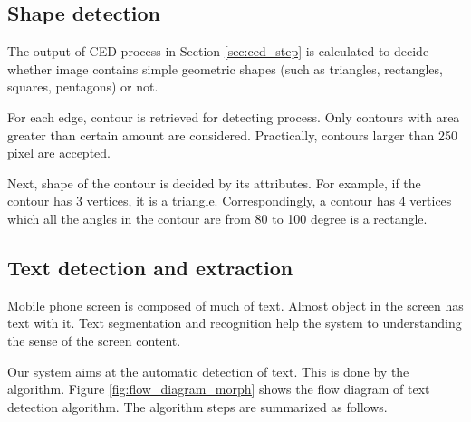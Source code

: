 \subsection{Shape detection}
\label{sec:shape_detect}
The output of CED process in Section \ref{sec:ced_step} is calculated to decide whether image contains simple geometric shapes (such as triangles, rectangles, squares, pentagons) or not.

For each edge, contour is retrieved for detecting process. Only contours with area greater than certain amount are considered. Practically, contours larger than 250 pixel are accepted.

Next, shape of the contour is decided by its attributes. For example, if the contour has 3 vertices, it is a triangle. Correspondingly, a contour has 4 vertices which all the angles in the contour are from 80 to 100 degree is a rectangle.

\subsection{Text detection and extraction}
\label{sec:text_detect}
Mobile phone screen is composed of much of text. Almost object in the screen has text with it. Text segmentation and recognition help the system to understanding the sense of the screen content.

Our system aims at the automatic detection of text. This is done by the algorithm. Figure \ref{fig:flow_diagram_morph} shows the flow diagram of text detection algorithm. The algorithm steps are summarized as follows.

